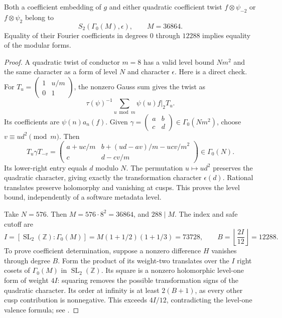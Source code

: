 \begin{lemma}\label{bt-common-level}
Both a coefficient embedding of $g$ and either quadratic coefficient
twist $f\otimes\psi_{-2}$ or $f\otimes\psi_2$ belong to
\[
 S_2(\Gamma_0(M),\epsilon),\qquad M=36864.
\]
Equality of their Fourier coefficients in degrees $0$ through $12288$
implies equality of the modular forms.
\end{lemma}
\begin{proof}
A quadratic twist of conductor $m=8$ has a valid level bound $Nm^2$
and the same character as a form of level $N$ and character $\epsilon$.
Here is a direct check. For $T_u=\left(\begin{smallmatrix}1&u/m\\0&1\end{smallmatrix}\right)$,
the nonzero Gauss sum gives the twist as
\[
 \tau(\psi)^{-1}\sum_{u\bmod m}\psi(u)f|_2T_u.
\]
Its coefficients are $\psi(n)a_n(f)$. Given
$\gamma=\left(\begin{smallmatrix}a&b\\c&d\end{smallmatrix}\right)
\in\Gamma_0(Nm^2)$, choose $v\equiv ud^2\pmod m$. Then
\[
 T_u\gamma T_{-v}=
 \begin{pmatrix}
 a+uc/m&b+(ud-av)/m-ucv/m^2\\
 c&d-cv/m
 \end{pmatrix}
 \in\Gamma_0(N).
\]
Its lower-right entry equals $d$ modulo $N$. The permutation
$u\mapsto ud^2$ preserves the quadratic character, giving exactly
the transformation character $\epsilon(d)$. Rational translates
preserve holomorphy and vanishing at cusps. This proves the level
bound, independently of a software metadata level.

Take $N=576$. Then $M=576\cdot8^2=36864$, and $288\mid M$.
The index and safe cutoff are
\begin{equation}\label{bt-sturm-bound}
 I=[\operatorname{SL}_2(\mathbb Z):\Gamma_0(M)]
   =M(1+1/2)(1+1/3)=73728,
 \qquad B=\left\lfloor\frac{2I}{12}\right\rfloor=12288.
\end{equation}
To prove coefficient determination, suppose a nonzero difference $H$
vanishes through degree $B$. Form the product of its weight-two
translates over the $I$ right cosets of $\Gamma_0(M)$ in
$\operatorname{SL}_2(\mathbb Z)$. Its square is a nonzero
holomorphic level-one form of weight $4I$: squaring removes the
possible transformation signs of the quadratic character. Its order
at infinity is at least $2(B+1)$, as every other cusp contribution
is nonnegative. This exceeds $4I/12$, contradicting the level-one
valence formula; see \cite[Proposition~4.12 and Example~4.13]{MilneModularFunctions}.
\end{proof}

